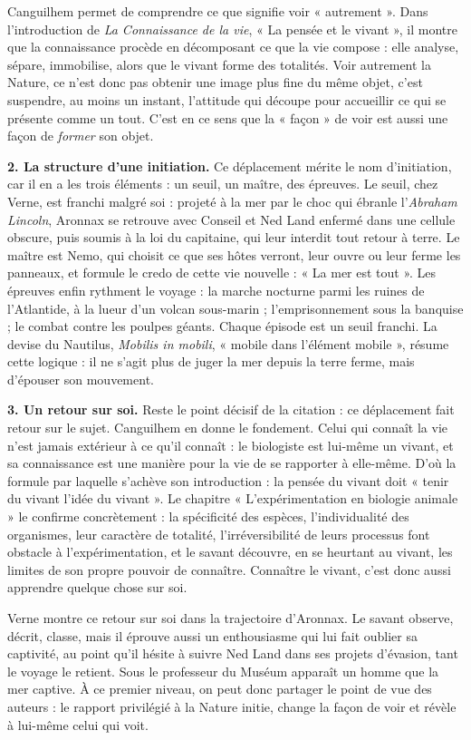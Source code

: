 \documentclass[11pt,a4paper]{article}
\begin{document}
Canguilhem permet de comprendre ce que signifie voir « autrement ». Dans l'introduction de \emph{La Connaissance de la vie}, « La pensée et le vivant », il montre que la connaissance procède en décomposant ce que la vie compose : elle analyse, sépare, immobilise, alors que le vivant forme des totalités. Voir autrement la Nature, ce n'est donc pas obtenir une image plus fine du même objet, c'est suspendre, au moins un instant, l'attitude qui découpe pour accueillir ce qui se présente comme un tout. C'est en ce sens que la « façon » de voir est aussi une façon de \emph{former} son objet.

\textbf{2. La structure d'une initiation.} Ce déplacement mérite le nom d'initiation, car il en a les trois éléments : un seuil, un maître, des épreuves. Le seuil, chez Verne, est franchi malgré soi : projeté à la mer par le choc qui ébranle l'\emph{Abraham Lincoln}, Aronnax se retrouve avec Conseil et Ned Land enfermé dans une cellule obscure, puis soumis à la loi du capitaine, qui leur interdit tout retour à terre. Le maître est Nemo, qui choisit ce que ses hôtes verront, leur ouvre ou leur ferme les panneaux, et formule le credo de cette vie nouvelle : « La mer est tout ». Les épreuves enfin rythment le voyage : la marche nocturne parmi les ruines de l'Atlantide, à la lueur d'un volcan sous-marin ; l'emprisonnement sous la banquise ; le combat contre les poulpes géants. Chaque épisode est un seuil franchi. La devise du Nautilus, \emph{Mobilis in mobili}, « mobile dans l'élément mobile », résume cette logique : il ne s'agit plus de juger la mer depuis la terre ferme, mais d'épouser son mouvement.

\textbf{3. Un retour sur soi.} Reste le point décisif de la citation : ce déplacement fait retour sur le sujet. Canguilhem en donne le fondement. Celui qui connaît la vie n'est jamais extérieur à ce qu'il connaît : le biologiste est lui-même un vivant, et sa connaissance est une manière pour la vie de se rapporter à elle-même. D'où la formule par laquelle s'achève son introduction : la pensée du vivant doit « tenir du vivant l'idée du vivant ». Le chapitre « L'expérimentation en biologie animale » le confirme concrètement : la spécificité des espèces, l'individualité des organismes, leur caractère de totalité, l'irréversibilité de leurs processus font obstacle à l'expérimentation, et le savant découvre, en se heurtant au vivant, les limites de son propre pouvoir de connaître. Connaître le vivant, c'est donc aussi apprendre quelque chose sur soi.

Verne montre ce retour sur soi dans la trajectoire d'Aronnax. Le savant observe, décrit, classe, mais il éprouve aussi un enthousiasme qui lui fait oublier sa captivité, au point qu'il hésite à suivre Ned Land dans ses projets d'évasion, tant le voyage le retient. Sous le professeur du Muséum apparaît un homme que la mer captive. À ce premier niveau, on peut donc partager le point de vue des auteurs : le rapport privilégié à la Nature initie, change la façon de voir et révèle à lui-même celui qui voit.
\end{document}
